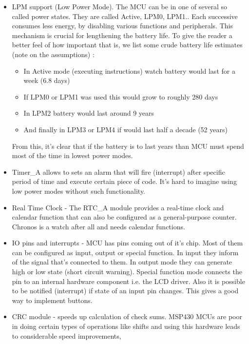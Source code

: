 \begin{itemize}
  \item LPM support (Low Power Mode). The MCU can be in one of several
        so called power states. They are called Active, LPM0, LPM1.. 
        Each successive consumes less energy, by disabling various
        functions and peripherals. This mechanism is crucial for
        lengthening the battery life. To give the reader a better feel of
        how important that is, we list some crude battery life
        estimates (note on the assumptions) :
\begin{itemize}
        \item In Active mode (executing instructions) watch battery would
        last for a week (6.8 days)
        \item If LPM0 or LPM1 was used this would grow to roughly 280 days
        \item In LPM2 battery would last around 9 years
        \item And finally in LPM3 or LPM4 if would last half a decade (52
        years)
\end{itemize}
        From this, it's clear that if the battery is to last years
        than MCU must spend most of the time in lowest power modes.
 \item Timer\_A allows to sets an alarm that will fire (interrupt) after specific
       period of time and execute certain piece of code. It's hard to
       imagine using low power modes without such functionality.
 \item Real Time Clock - The RTC\_A module provides a real-time clock
       and calendar function that can also be configured as a
       general-purpose counter. Chronos is a watch after all and needs
       calendar functions.
 \item IO pins and interrupts - MCU has pins coming out of it's chip.
       Most of them can be configured as input, output or special
       function. In input they inform of the signal that's connected to
       them. In output mode they can generate high or low state (short
       circuit warning). Special function mode connects the pin to an
       internal hardware component i.e. the LCD driver.
       Also it is possible to be notified (interrupt) if state of an
       input pin changes. This gives a good way to implement buttons.
 \item CRC module - speeds up calculation of check sums. MSP430 MCUs
       are poor in doing certain types of operations like shifts and
       using this hardware leads to considerable speed improvements,

\end{itemize}
